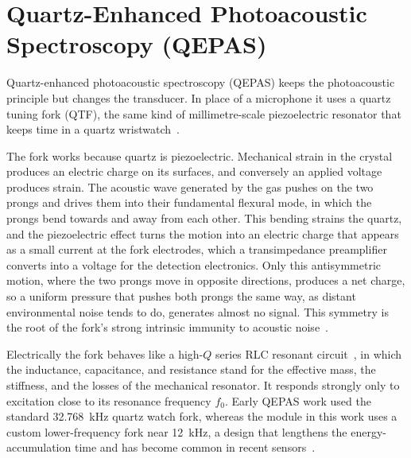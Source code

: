 \section{Quartz-Enhanced Photoacoustic Spectroscopy (QEPAS)}
\label{sec:qepas}

Quartz-enhanced photoacoustic spectroscopy (QEPAS) keeps the photoacoustic principle but changes the transducer. In place of a microphone it uses a quartz tuning fork (QTF), the same kind of millimetre-scale piezoelectric resonator that keeps time in a quartz wristwatch~\cite{kosterev2002}.

The fork works because quartz is piezoelectric. Mechanical strain in the crystal produces an electric charge on its surfaces, and conversely an applied voltage produces strain. The acoustic wave generated by the gas pushes on the two prongs and drives them into their fundamental flexural mode, in which the prongs bend towards and away from each other. This bending strains the quartz, and the piezoelectric effect turns the motion into an electric charge that appears as a small current at the fork electrodes, which a transimpedance preamplifier converts into a voltage for the detection electronics. Only this antisymmetric motion, where the two prongs move in opposite directions, produces a net charge, so a uniform pressure that pushes both prongs the same way, as distant environmental noise tends to do, generates almost no signal. This symmetry is the root of the fork's strong intrinsic immunity to acoustic noise~.

Electrically the fork behaves like a high-$Q$ series RLC resonant circuit~, in which the inductance, capacitance, and resistance stand for the effective mass, the stiffness, and the losses of the mechanical resonator. It responds strongly only to excitation close to its resonance frequency $f_0$. Early QEPAS work used the standard \SI{32.768}{\kilo\hertz} quartz watch fork, whereas the module in this work uses a custom lower-frequency fork near \SI{12}{\kilo\hertz}, a design that lengthens the energy-accumulation time and has become common in recent sensors~\cite{patimisco2014, lin2023}.

